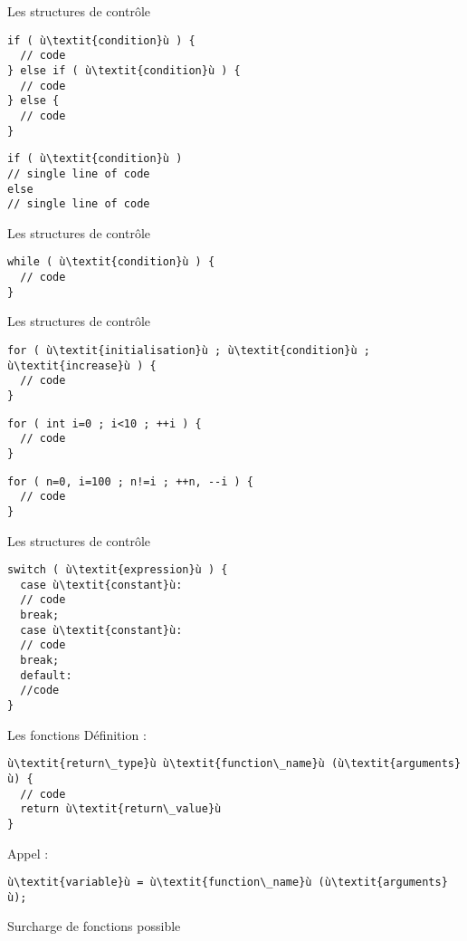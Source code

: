 \begin{frame}[fragile]{Les structures de contrôle}
  \begin{lstlisting}[escapechar=ù]
if ( ù\textit{condition}ù ) {
  // code
} else if ( ù\textit{condition}ù ) {
  // code
} else {
  // code
}
  \end{lstlisting}

  \begin{lstlisting}[escapechar=ù]
if ( ù\textit{condition}ù )
// single line of code
else
// single line of code
  \end{lstlisting}
\end{frame}

\begin{frame}[fragile]{Les structures de contrôle}
  \begin{lstlisting}[escapechar=ù]
while ( ù\textit{condition}ù ) {
  // code
}
  \end{lstlisting}
\end{frame}

\begin{frame}[fragile]{Les structures de contrôle}
  \begin{lstlisting}[escapechar=ù]
for ( ù\textit{initialisation}ù ; ù\textit{condition}ù ; ù\textit{increase}ù ) {
  // code
}
  \end{lstlisting}

  \begin{lstlisting}
for ( int i=0 ; i<10 ; ++i ) {
  // code
}
  \end{lstlisting}
  \begin{lstlisting}
for ( n=0, i=100 ; n!=i ; ++n, --i ) {
  // code
}
  \end{lstlisting}
\end{frame}

\begin{frame}[fragile]{Les structures de contrôle}
  \begin{lstlisting}[escapechar=ù]
switch ( ù\textit{expression}ù ) {
  case ù\textit{constant}ù:
  // code
  break;
  case ù\textit{constant}ù:
  // code
  break;
  default:
  //code
}
  \end{lstlisting}
\end{frame}

\begin{frame}[fragile]{Les fonctions}
  Définition :
  \begin{lstlisting}[escapechar=ù]
ù\textit{return\_type}ù ù\textit{function\_name}ù (ù\textit{arguments}ù) {
  // code
  return ù\textit{return\_value}ù
}
  \end{lstlisting}

  Appel :
  \begin{lstlisting}[escapechar=ù]
ù\textit{variable}ù = ù\textit{function\_name}ù (ù\textit{arguments}ù);
  \end{lstlisting}

  Surcharge de fonctions possible
\end{frame}

